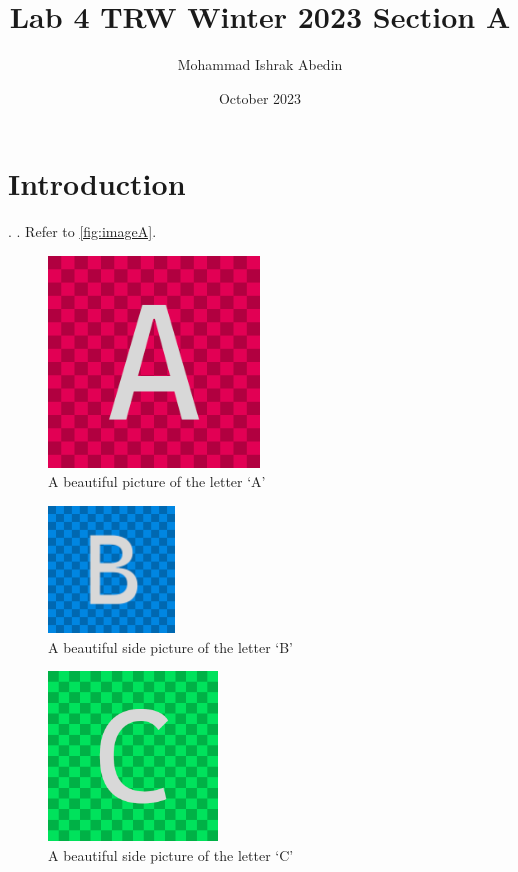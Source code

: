 \documentclass[a4paper, 12pt]{article}
\title{Lab 4 TRW Winter 2023 Section A}
\author{Mohammad Ishrak Abedin}
\date{October 2023}
\begin{document}
\begin{titlepage}
    \maketitle
\end{titlepage}

\section{Introduction}
\lipsum[1-4]. \lipsum[1]. Refer to \autoref{fig:imageA}.

\begin{figure}[htbp]
    \centering
    \includegraphics[width=0.5\textwidth]{ ImageA }
    \caption{A beautiful picture of the letter `A'}
    \label{fig:imageA}
\end{figure}

\lipsum[1-3]

\begin{figure}
    \centering
    \includegraphics[width=0.3\textwidth]{ ImageB }
    \caption{A beautiful side picture of the letter `B'}
    \label{fig:imageB_side}
\end{figure}

\lipsum[1-2]

\begin{figure}
    \centering
    \includegraphics[width=0.4\textwidth]{ ImageC }
    \caption{A beautiful side picture of the letter `C'}
    \label{fig:imageC_side}
\end{figure}
\end{document}
